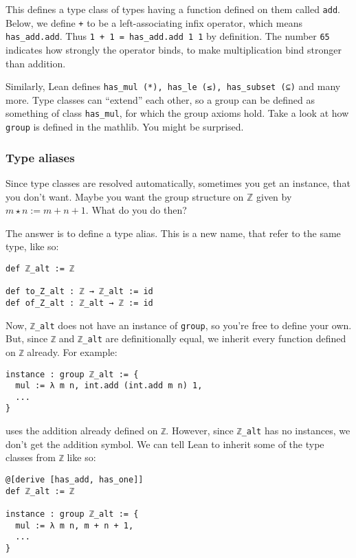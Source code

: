 \documentclass[a4paper, 12pt]{article}
\newcommand{\Z}{\mathbb{Z}}
\newcommand{\lean}[1]{\texttt{#1}}
\theoremstyle{changedot}
\theoremstyle{changedotbreak}
\theoremstyle{nonumberplain}
\begin{document}
This defines a type class of types having a function defined on them called \lean{add}. Below, we define \lean{+} to be a left-associating infix operator, which means \lean{has_add.add}. Thus \lean{1 + 1 = has_add.add 1 1} by definition. The number \lean{65} indicates how strongly the operator binds, to make multiplication bind stronger than addition.

Similarly, Lean defines \lean{has_mul (*), has_le (≤), has_subset (⊆)} and many more. Type classes can ``extend'' each other, so a group can be defined as something of class \lean{has_mul}, for which the group axioms hold. Take a look at how \lean{group} is defined in the mathlib. You might be surprised.

\subsubsection{Type aliases}\label{sss:typealias}
Since type classes are resolved automatically, sometimes you get an instance, that you don't want. Maybe you want the group structure on $\Z$ given by $m \star n := m + n + 1$. What do you do then?

The answer is to define a type alias. This is a new name, that refer to the same type, like so:

\begin{verbatim}
def ℤ_alt := ℤ

def to_Z_alt : ℤ → ℤ_alt := id
def of_Z_alt : ℤ_alt → ℤ := id
\end{verbatim}

Now, \lean{ℤ_alt} does not have an instance of \lean{group}, so you're free to define your own. But, since \lean{ℤ} and \lean{ℤ_alt} are definitionally equal, we inherit every function defined on \lean{ℤ} already. For example:

\begin{verbatim}
instance : group ℤ_alt := {
  mul := λ m n, int.add (int.add m n) 1,
  ...
}
\end{verbatim}

uses the addition already defined on \lean{ℤ}. However, since \lean{ℤ_alt} has no instances, we don't get the addition symbol. We can tell Lean to inherit some of the type classes from \lean{ℤ} like so:

\begin{verbatim}
@[derive [has_add, has_one]]
def ℤ_alt := ℤ

instance : group ℤ_alt := {
  mul := λ m n, m + n + 1,
  ...
}
\end{verbatim}
\end{document}
